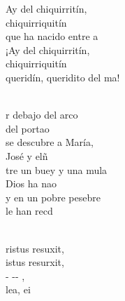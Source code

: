 \documentclass[12pt]{article}
\begin{document}
\begin{multicols*}{2}
\begin{cancion}[Chiquirritín][]%
	\begin{chorus}%
	Ay del chiquirritín,\\
chiquirriquitín\\
	que ha nacido entre a\\
¡Ay del chiquirritín, \\
chiquirriquitín\\
	queridín, queridito del ma!\\
	\end{chorus}%
	\jump\\
	r debajo del arco \\
	del portao\\
se descubre a María, \\
	José y elñ \\
\jump
	tre un buey y una mula\\
	Dios ha nao\\
y en un pobre pesebre \\
	le han recd\\
\end{cancion}%

\begin{cancion}%
	   \\
	ristus resuxit,\\
	istus resurxit,\\
	- -- , \\
	 lea, ei\\
\end{cancion}%


\end{multicols*}
\end{document}
